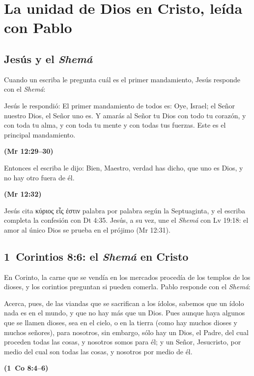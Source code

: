 \documentclass[11pt,letterpaper]{article}
\newcommand{\grc}[1]{\foreignlanguage{ancientgreek}{#1}}
\newcommand{\fuente}[1]{\par\hfill{\upshape\bfseries\small\textcolor{azul}{#1}}}
\begin{document}
\section{La unidad de Dios en Cristo, leída con Pablo}\label{sec:cristo-uno}

\subsection{Jesús y el \emph{Shemá}}
Cuando un escriba le pregunta cuál es el primer mandamiento, Jesús responde con el \emph{Shemá}:

\begin{cita}Jesús le respondió: El primer mandamiento de todos es: Oye, Israel; el Señor nuestro Dios, el Señor uno es. Y amarás al Señor tu Dios con todo tu corazón, y con toda tu alma, y con toda tu mente y con todas tus fuerzas. Este es el principal mandamiento.\fuente{(Mr 12:29--30)}\end{cita}
\begin{cita}Entonces el escriba le dijo: Bien, Maestro, verdad has dicho, que uno es Dios, y no hay otro fuera de él.\fuente{(Mr 12:32)}\end{cita}

Jesús cita \grc{κύριος εἷς ἐστιν} palabra por palabra según la Septuaginta, y el escriba completa la confesión con Dt 4:35. Jesús, a su vez, une el \emph{Shemá} con Lv 19:18: el amor al único Dios se prueba en el prójimo (Mr 12:31).

\subsection{1~Corintios 8:6: el \emph{Shemá} en Cristo}
En Corinto, la carne que se vendía en los mercados procedía de los templos de los dioses, y los corintios preguntan si pueden comerla. Pablo responde con el \emph{Shemá}:

\begin{cita}Acerca, pues, de las viandas que se sacrifican a los ídolos, sabemos que un ídolo nada es en el mundo, y que no hay más que un Dios. Pues aunque haya algunos que se llamen dioses, sea en el cielo, o en la tierra (como hay muchos dioses y muchos señores), para nosotros, sin embargo, sólo hay un Dios, el Padre, del cual proceden todas las cosas, y nosotros somos para él; y un Señor, Jesucristo, por medio del cual son todas las cosas, y nosotros por medio de él.\fuente{(1~Co 8:4--6)}\end{cita}
\end{document}
